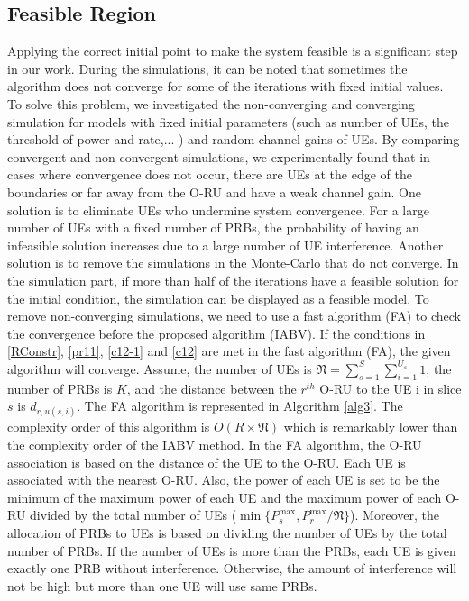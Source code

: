\documentclass[lettersize,journal]{IEEEtran}
\begin{document}
\subsection{Feasible Region}\label{fr}
Applying the correct initial point to make the system feasible is a significant step in our work.
During the simulations, it can be noted that sometimes the algorithm does not converge for some of the iterations with fixed initial values.
To solve this problem, we investigated the non-converging and converging simulation for models with fixed initial parameters (such as number of UEs, the threshold of power and rate,... ) and random channel gains of UEs.
By comparing convergent and non-convergent simulations, we experimentally found that in cases where convergence does not occur, there are UEs at the edge of the boundaries or far away from the O-RU and have a weak channel gain. One solution is to eliminate UEs who undermine system convergence.
For a large number of UEs with a fixed number of PRBs, the probability of having an infeasible solution increases due to a large number of UE interference.
Another solution is to remove the simulations in the Monte-Carlo that do not converge.
In the simulation part, if more than half of the iterations have a feasible solution for the initial condition, the simulation can be displayed as a feasible model.
To remove non-converging simulations, we need to use a fast algorithm (FA) to check the convergence before
the proposed algorithm (IABV).
If the conditions in \eqref{RConstr}, \eqref{pr11}, \eqref{c12-1} and \eqref{c12} are met in the fast algorithm (FA), the given algorithm will converge.
Assume, the number of UEs is $\mathfrak{N} = \sum_{s=1}^{S}\sum_{i=1}^{U_s}1$,
the number of PRBs is $K$, and the distance between the $r^{th}$ O-RU to the UE i in slice $s$ is $d_{r,u(s,i)}$.
The FA algorithm is represented in Algorithm \ref{alg3}.
The complexity order of this algorithm is $O(R\times \mathfrak{N})$ which is remarkably lower than the complexity order of the IABV method.
In the FA algorithm, the O-RU association is based on the distance of the UE to the O-RU.
Each UE is associated with the nearest O-RU. Also, the power of each UE is set to be the minimum of the maximum power of each UE and the maximum power of each O-RU divided by the total number of UEs ($\min\{P_s^{\max}, P_r^{\max}/\mathfrak{N}\}$).
Moreover, the allocation of PRBs to UEs is based on dividing the number of UEs by the total number of PRBs.
If the number of UEs is more than the PRBs, each UE is given exactly one PRB without interference. Otherwise, the amount of interference will not be high but more than one UE will use same PRBs.
\end{document}

